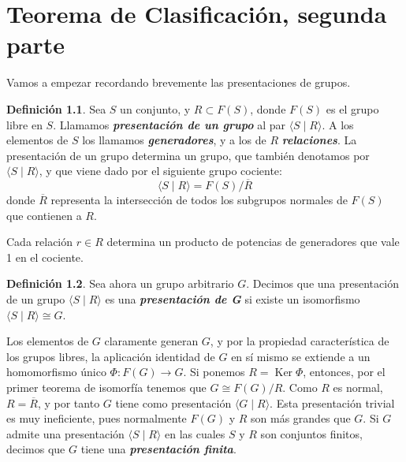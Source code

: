 \documentclass[10pt]{report}
\DeclareMathOperator{\Ker}{Ker}
\newcommand{\Esfera}{\mathbb{S}^2}
\newcommand{\enfatiza}[1]{\textbf{\textit{#1}}}
\theoremstyle{definition}
\newtheorem{defin}{Definición}[section]
\begin{document}



\chapter{Teorema de Clasificación, segunda parte}
Vamos a empezar recordando brevemente las presentaciones de grupos. 

\begin{defin}
Sea $S$ un conjunto, y $R\subset F(S)$, donde $F(S)$ es el grupo libre en $S$. Llamamos \enfatiza{presentación de un grupo} al par $\langle S \mid R\rangle$. A los elementos de $S$ los llamamos \enfatiza{generadores}, y a los de $R$ \enfatiza{relaciones}. La presentación de un grupo determina un grupo, que también denotamos por $\langle S \mid R \rangle$, y que viene dado por el siguiente grupo cociente: 
\[
\langle S\mid R\rangle = F(S)/\overline{R}
\]
donde $\overline{R}$ representa la intersección de todos los subgrupos normales de $F(S)$ que contienen a $R$.
\end{defin}
Cada relación $r\in R$ determina un producto de potencias de generadores que vale 1 en el cociente.
\begin{defin}
Sea ahora un grupo arbitrario $G$. Decimos que una presentación de un grupo $\langle S \mid R \rangle$ es una \enfatiza{presentación de G} si existe un isomorfismo $\langle S \mid R\rangle \cong G$. 
\end{defin}
Los elementos de $G$ claramente generan $G$, y por la propiedad característica de los grupos libres, la aplicación identidad de $G$ en sí mismo se extiende a un homomorfismo único $\Phi: F(G) \to G$. Si ponemos $R= \Ker{\Phi}$, entonces, por el primer teorema de isomorfía tenemos que $G\cong F(G)/R$. Como $R$ es normal, $R=\overline{R}$, y por tanto $G$ tiene como presentación $\langle G\mid R\rangle$. Esta presentación trivial es muy ineficiente, pues normalmente $F(G)$ y $R$ son más grandes que $G$. 
Si $G$ admite una presentación $\langle S\mid R	\rangle$ en las cuales $S$ y $R$ son conjuntos finitos, decimos que $G$ tiene una \enfatiza{presentación finita}.
\end{document}
